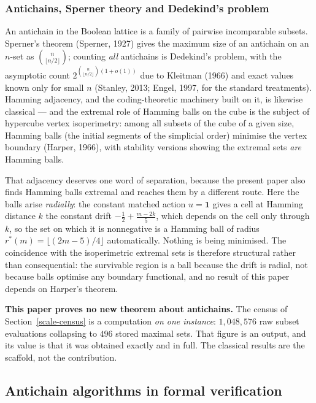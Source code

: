 \documentclass[10pt,twocolumn]{article}
\theoremstyle{plain}
\theoremstyle{definition}
\theoremstyle{remark}
\begin{document}
\subsubsection{Antichains, Sperner theory and Dedekind's problem}

An antichain in the Boolean lattice is a family of pairwise incomparable subsets. Sperner's
theorem (Sperner, 1927) gives the maximum size of an antichain on an \(n\)-set as
\(\binom{n}{\lfloor n/2\rfloor}\); counting \emph{all} antichains is Dedekind's problem,
with the asymptotic count \(2^{\binom{n}{\lfloor n/2\rfloor}(1+o(1))}\) due to Kleitman
(1966) and exact values known only for small \(n\) (Stanley, 2013; Engel, 1997, for the
standard treatments). Hamming adjacency, and the coding-theoretic machinery built on it, is
likewise classical --- and the extremal role of Hamming balls on the cube is the subject of
hypercube vertex isoperimetry: among all subsets of the cube of a given size, Hamming balls
(the initial segments of the simplicial order) minimise the vertex boundary (Harper, 1966),
with stability versions showing the extremal sets \emph{are} Hamming balls.

That adjacency deserves one word of separation, because the present paper also finds Hamming
balls extremal and reaches them by a different route. Here the balls arise \emph{radially}: the
constant matched action \(u = \mathbf{1}\) gives a cell at Hamming distance \(k\) the constant
drift \(-\tfrac12 + \tfrac{m-2k}{5}\), which depends on the cell only through \(k\), so the set
on which it is nonnegative is a Hamming ball of radius \(r^{*}(m) = \lfloor (2m-5)/4\rfloor\)
automatically. Nothing is being minimised. The coincidence with the isoperimetric extremal sets
is therefore structural rather than consequential: the survivable region is a ball because the
drift is radial, not because balls optimise any boundary functional, and no result of this
paper depends on Harper's theorem.

\textbf{This paper proves no new theorem about antichains.} The census of
Section~\ref{scale-census} is a computation \emph{on one instance}: \(1{,}048{,}576\) raw subset
evaluations collapsing to \(496\) stored maximal sets. That figure is an output, and its
value is that it was obtained exactly and in full. The classical results are the scaffold,
not the contribution.

\subsection{Antichain algorithms in formal verification}
\end{document}
